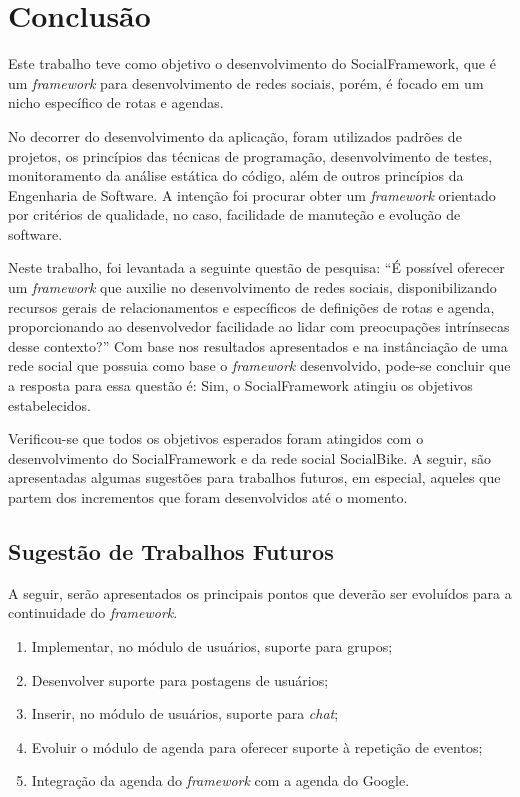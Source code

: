 \chapter{Conclusão}
\label{chapter:Conclusao}
Este trabalho teve como objetivo o desenvolvimento do SocialFramework, que é um \textit{framework} para desenvolvimento de redes sociais, porém, é focado em um nicho específico de rotas e agendas.

No decorrer do desenvolvimento da aplicação, foram utilizados padrões de projetos, os princípios das técnicas de programação, desenvolvimento de testes, monitoramento da análise estática do código, além de outros princípios da Engenharia de Software. A intenção foi procurar obter um \textit{framework} orientado por critérios de qualidade, no caso, facilidade de manuteção e evolução de software.

Neste trabalho, foi levantada a seguinte questão de pesquisa: ``É possível oferecer um \textit{framework} que auxilie no desenvolvimento de redes sociais, disponibilizando recursos gerais de relacionamentos e específicos de definições de rotas e agenda, proporcionando ao desenvolvedor facilidade ao lidar com preocupações intrínsecas desse contexto?'' Com base nos resultados apresentados e na instânciação de uma rede social que possuia como base o \textit{framework} desenvolvido, pode-se concluir que a resposta para essa questão é: Sim, o SocialFramework atingiu os objetivos estabelecidos.

Verificou-se que todos os objetivos esperados foram atingidos com o desenvolvimento do SocialFramework e da rede social SocialBike. A seguir, são apresentadas algumas sugestões para trabalhos futuros, em especial, aqueles que partem dos incrementos que foram desenvolvidos até o momento.

\section{Sugestão de Trabalhos Futuros}

A seguir, serão apresentados os principais pontos que deverão ser evoluídos para a continuidade do \textit{framework}.

\begin{enumerate}
	\item Implementar, no módulo de usuários, suporte para grupos;
	\item Desenvolver suporte para postagens de usuários;
	\item Inserir, no módulo de usuários, suporte para \textit{chat};
	\item Evoluir o módulo de agenda para oferecer suporte à repetição de eventos;
	\item Integração da agenda do \textit{framework} com a agenda do Google.
\end{enumerate}
